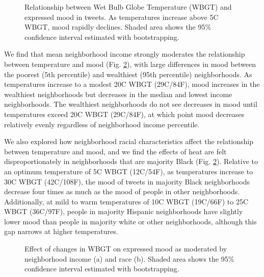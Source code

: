 \documentclass[titlepage]{article}
\begin{document}
\begin{figure}[H]
 \centering
 \caption{Relationship between Wet Bulb Globe Temperature (WBGT) and expressed mood in tweets. As temperatures increase above 5\textdegree C WBGT, mood rapidly declines.  Shaded area shows the 95\% confidence interval estimated with bootstrapping.}
 \label{fig:wbgt}
\end{figure}

We find that mean neighborhood income strongly moderates the relationship between temperature and mood (Fig. \ref{fig:hetero}), with large differences in mood between the poorest (5th percentile) and wealthiest (95th percentile) neighborhoods. As temperatures increase to a modest 20\textdegree C WBGT (29\textdegree C/84\textdegree F), mood increases in the wealthiest neighborhoods but decreases in the median and lowest income neighborhoods. The wealthiest neighborhoods do not see decreases in mood until temperatures exceed 20\textdegree C WBGT (29\textdegree C/84\textdegree F), at which point mood decreases relatively evenly regardless of neighborhood income percentile.

We also explored how neighborhood racial characteristics affect the relationship between temperature and mood, and we find the effects of heat are felt disproportionately in neighborhoods that are majority Black (Fig. \ref{fig:hetero}). Relative to an optimum temperature of 5\textdegree C WBGT (12\textdegree C/54\textdegree F), as temperatures increase to 30\textdegree C WBGT (42\textdegree C/108\textdegree F), the mood of tweets in majority Black neighborhoods decrease four times as much as the mood of people in other neighborhoods. Additionally, at mild to warm temperatures of 10\textdegree C WBGT (19\textdegree C/66\textdegree F) to 25\textdegree C WBGT (36\textdegree C/97\textdegree F), people in majority Hispanic neighborhoods have slightly lower mood than people in majority white or other neighborhoods, although this gap narrows at higher temperatures.

\begin{figure}[H]
  \caption{Effect of changes in WBGT on expressed mood as moderated by neighborhood income (a) and race (b). Shaded area shows the 95\% confidence interval estimated with bootstrapping.}
\label{fig:hetero}
\end{figure}
\end{document}
